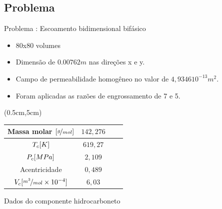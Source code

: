 \documentclass[professionalfont]{beamer}
\begin{document}
\subsection{Problema \theproblem}
\begin{frame}{Problema \theproblem: Escoamento bidimensional bifásico}

    \begin{itemize}
        \item 80x80 volumes
        \item Dimensão de $0.00762m$ nas direções x e y.
        \item Campo de permeabilidade homogêneo no valor de $4,9346 10^{-13} m^{2}$.
        \item Foram aplicadas as razões de engrossamento de 7 e 5.
    \end{itemize}
    
    \vspace*{5cm}

    \begin{textblock*}{6cm}(0.5cm,5cm) %
        \small
    \begin{table}[!ht]
        \centering
        \begin{subtable}{\textwidth}
            \centering
            \begin{tabular}{|c|c|c|c|}
                \hline
                Massa molar $[\nicefrac{g}{mol}]$ & $142,276$ \\
                \hline
                $T_{c} [K]$ & $619,27 $\\
                \hline
                $P_{c}[MPa]$ & $2,109$\\
                \hline
                Acentricidade & $0,489$\\
                \hline
                $V_{c} [\nicefrac{m^{3}}{mol} \times 10^{-4}]$ & $6,03$\\
                \hline            
            \end{tabular}

            \vspace{0.3cm}

            {\small Dados do componente hidrocarboneto}
            \label{tab:table_prob4.c}
        \end{subtable}
    \end{table}
    \end{textblock*}


\end{frame}
\end{document}
